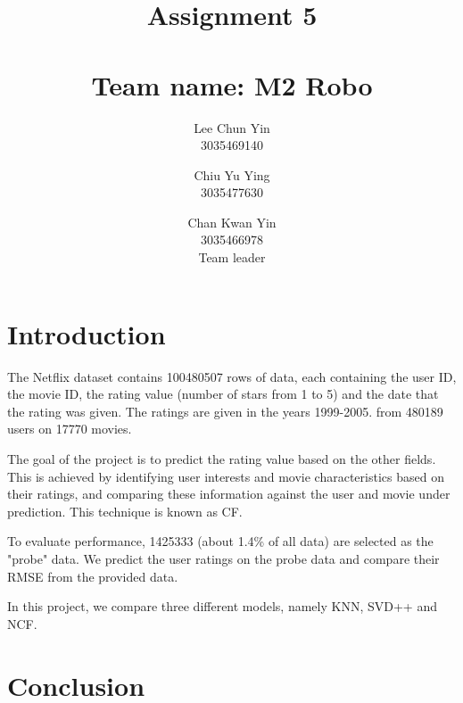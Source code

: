 \documentclass[final]{cvpr}
\begin{document}
\title{
	Assignment 5 \\~\\
	\large{Team name: M2 Robo}
}

\author{
	Lee Chun Yin\\
	3035469140\\
	\and
	Chiu Yu Ying\\
	3035477630
	\and
	Chan Kwan Yin\\
	3035466978 \\
	Team leader
}

\maketitle

\clearpage

\section{Introduction}
The Netflix dataset contains 100480507 rows of data,
each containing the user ID, the movie ID, the rating value (number of stars from 1 to 5)
and the date that the rating was given.
The ratings are given in the years 1999-2005.
from 480189 users on 17770 movies.

The goal of the project is to predict the rating value based on the other fields.
This is achieved by identifying user interests and movie characteristics based on their ratings,
and comparing these information against the user and movie under prediction.
This technique is known as \ac{CF}.

To evaluate performance, 1425333 (about 1.4\% of all data) are selected as the "probe" data.
We predict the user ratings on the probe data and compare their \ac{RMSE} from the provided data.

In this project, we compare three different models, namely
\ac{KNN}, \ac{SVD}++ and \ac{NCF}.

\section{Conclusion}

\end{document}
